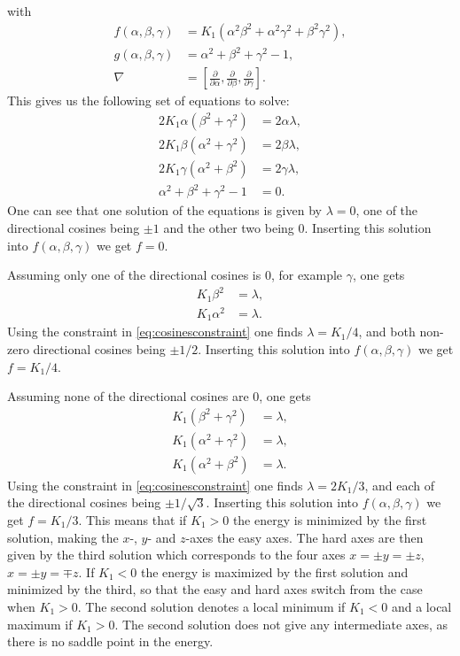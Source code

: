 \documentclass[12pt, a4paper, twoside, openright]{article}		%
\numberwithin{equation}{section}
\begin{document}
with
\begin{align}
f(\alpha, \beta, \gamma) &= K_1 (\alpha^2\beta^2+\alpha^2\gamma^2+\beta^2\gamma^2), \\
g(\alpha, \beta, \gamma) &= \alpha^2+\beta^2+\gamma^2 - 1,\\
\nabla &= \left[\frac{\partial}{\partial\alpha}, \frac{\partial}{\partial\beta}, \frac{\partial}{\partial\gamma}\right].
\end{align}
This gives us the following set of equations to solve:
\begin{align*}
2K_1\alpha (\beta^2+\gamma^2) &= 2\alpha\lambda, \\ 
2K_1\beta (\alpha^2+\gamma^2) &= 2\beta\lambda, \\ 
2K_1\gamma (\alpha^2+\beta^2) &= 2\gamma\lambda, \\ 
\alpha^2+\beta^2+\gamma^2 - 1 &= 0.
\end{align*}
One can see that one solution of the equations is given by $\lambda = 0$, one of the directional cosines being $\pm 1$ and the other two being 0. Inserting this solution into $f(\alpha, \beta, \gamma)$ we get $f = 0$.

Assuming only one of the directional cosines is 0, for example $\gamma$, one gets
\begin{align*}
K_1 \beta^2 &= \lambda, \\ 
K_1 \alpha^2 &= \lambda.
\end{align*}
Using the constraint in \eqref{eq:cosinesconstraint} one finds $\lambda = K_1/4$, and both non-zero directional cosines being $\pm 1/2$. Inserting this solution into $f(\alpha, \beta, \gamma)$ we get $f = K_1/4$.

Assuming none of the directional cosines are 0, one gets
\begin{align*}
K_1 (\beta^2+\gamma^2) &= \lambda, \\ 
K_1 (\alpha^2+\gamma^2) &= \lambda, \\ 
K_1 (\alpha^2+\beta^2) &= \lambda.
\end{align*}
Using the constraint in \eqref{eq:cosinesconstraint} one finds $\lambda = 2K_1/3$, and each of the directional cosines being $\pm 1/\sqrt{3}$. Inserting this solution into $f(\alpha, \beta, \gamma)$ we get $f = K_1/3$. This means that if $K_1 > 0$ the energy is minimized by the first solution, making the $x$-, $y$- and $z$-axes the easy axes. The hard axes are then given by the third solution which corresponds to the four axes $x = \pm y = \pm z$, $x = \pm y = \mp z$. If $K_1 < 0$ the energy is maximized by the first solution and minimized by the third, so that the easy and hard axes switch from the case when $K_1 > 0$. The second solution denotes a local minimum if $K_1<0$ and a local maximum if $K_1>0$. The second solution does not give any intermediate axes, as there is no saddle point in the energy.
\end{document}
